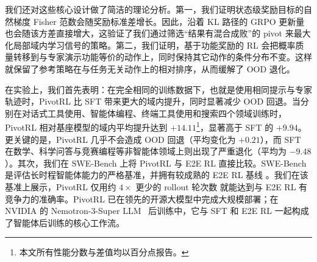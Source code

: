 我们还对这些核心设计做了简洁的理论分析。第一，我们证明状态级奖励目标的自然梯度 Fisher 范数会随奖励标准差增长。因此，沿着 KL 路径的 GRPO 更新量也会随该方差直接增大，这验证了我们通过筛选“结果有混合成败”的 pivot 来最大化局部域内学习信号的策略。第二，我们证明，基于功能奖励的 RL 会把概率质量转移到与专家演示功能等价的动作上，同时保持其它动作的条件分布不变。这样就保留了参考策略在与任务无关动作上的相对排序，从而缓解了 OOD 退化。

在实验上，我们首先表明：在完全相同的训练数据下，也就是使用相同提示与专家轨迹时，PivotRL 比 SFT 带来更大的域内提升，同时显著减少 OOD 回退。当分别在对话式工具使用、智能体编程、终端工具使用和搜索四个领域训练时，PivotRL 相对基座模型的域内平均提升达到 $+14.11$\footnote{本文所有性能分数与差值均以百分点报告。}，显著高于 SFT 的 $+9.94$。更关键的是，PivotRL 几乎不会造成 OOD 回退（平均变化为 +$0.21$），而 SFT 在数学、科学问答与竞赛编程等非智能体领域上则出现了严重退化（平均为 $-9.48$）。其次，我们在 SWE-Bench 上将 PivotRL 与 E2E RL 直接比较。SWE-Bench 是评估长时程智能体能力的严格基准，并拥有较成熟的 E2E RL 基线 \citep{jimenez2024swebench, wang2025openhandsopenplatformai}。我们在该基准上展示，PivotRL 仅用约 {$4\times$ 更少的 rollout 轮次数} 就能达到与 E2E RL 有竞争力的准确率。PivotRL 已在领先的开源大模型中完成大规模部署；在 NVIDIA 的 Nemotron-3-Super LLM~\citep{nvidia2025nemotron3super} 后训练中，它与 SFT 和 E2E RL 一起构成了智能体后训练的核心工作流。
